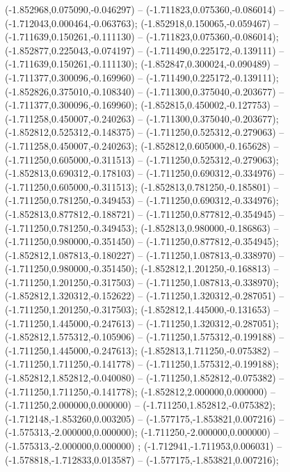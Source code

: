  (-1.852968,0.075090,-0.046297) -- (-1.711823,0.075360,-0.086014) -- (-1.712043,0.000464,-0.063763);
 (-1.852918,0.150065,-0.059467) -- (-1.711639,0.150261,-0.111130) -- (-1.711823,0.075360,-0.086014);
 (-1.852877,0.225043,-0.074197) -- (-1.711490,0.225172,-0.139111) -- (-1.711639,0.150261,-0.111130);
 (-1.852847,0.300024,-0.090489) -- (-1.711377,0.300096,-0.169960) -- (-1.711490,0.225172,-0.139111);
 (-1.852826,0.375010,-0.108340) -- (-1.711300,0.375040,-0.203677) -- (-1.711377,0.300096,-0.169960);
 (-1.852815,0.450002,-0.127753) -- (-1.711258,0.450007,-0.240263) -- (-1.711300,0.375040,-0.203677);
 (-1.852812,0.525312,-0.148375) -- (-1.711250,0.525312,-0.279063) -- (-1.711258,0.450007,-0.240263);
 (-1.852812,0.605000,-0.165628) -- (-1.711250,0.605000,-0.311513) -- (-1.711250,0.525312,-0.279063);
 (-1.852813,0.690312,-0.178103) -- (-1.711250,0.690312,-0.334976) -- (-1.711250,0.605000,-0.311513);
 (-1.852813,0.781250,-0.185801) -- (-1.711250,0.781250,-0.349453) -- (-1.711250,0.690312,-0.334976);
 (-1.852813,0.877812,-0.188721) -- (-1.711250,0.877812,-0.354945) -- (-1.711250,0.781250,-0.349453);
 (-1.852813,0.980000,-0.186863) -- (-1.711250,0.980000,-0.351450) -- (-1.711250,0.877812,-0.354945);
 (-1.852812,1.087813,-0.180227) -- (-1.711250,1.087813,-0.338970) -- (-1.711250,0.980000,-0.351450);
 (-1.852812,1.201250,-0.168813) -- (-1.711250,1.201250,-0.317503) -- (-1.711250,1.087813,-0.338970);
 (-1.852812,1.320312,-0.152622) -- (-1.711250,1.320312,-0.287051) -- (-1.711250,1.201250,-0.317503);
 (-1.852812,1.445000,-0.131653) -- (-1.711250,1.445000,-0.247613) -- (-1.711250,1.320312,-0.287051);
 (-1.852812,1.575312,-0.105906) -- (-1.711250,1.575312,-0.199188) -- (-1.711250,1.445000,-0.247613);
 (-1.852813,1.711250,-0.075382) -- (-1.711250,1.711250,-0.141778) -- (-1.711250,1.575312,-0.199188);
 (-1.852812,1.852812,-0.040080) -- (-1.711250,1.852812,-0.075382) -- (-1.711250,1.711250,-0.141778);
 (-1.852812,2.000000,0.000000) -- (-1.711250,2.000000,0.000000) -- (-1.711250,1.852812,-0.075382);
 (-1.712148,-1.853260,0.003205) -- (-1.577175,-1.853821,0.007216) -- (-1.575313,-2.000000,0.000000);
 (-1.711250,-2.000000,0.000000) -- (-1.575313,-2.000000,0.000000) ;
 (-1.712941,-1.711953,0.006031) -- (-1.578818,-1.712833,0.013587) -- (-1.577175,-1.853821,0.007216);
